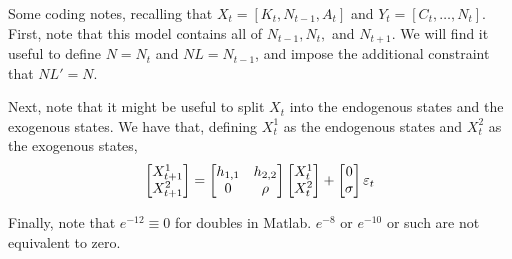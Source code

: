 \documentclass[10pt]{article}
\begin{document}
	\begin{remark}
		Some coding notes, recalling that $X_t = [K_t,N_{t-1},A_t]$ and $Y_t = [C_t,\dots,N_t]$. First, note that this model contains all of $N_{t-1},N_t,$ and $N_{t+1}$. We will find it useful to define $N = N_t$ and $NL = N_{t-1}$, and impose the additional constraint that $NL' = N$.
		
		Next, note that it might be useful to split $X_t$ into the endogenous states and the exogenous states. We have that, defining $X^1_t$ as the endogenous states and $X_t^2$ as the exogenous states,
		\[
		\begin{bmatrix}X_{t+1}^1 \\ X_{t+1}^2 \end{bmatrix} = \begin{bmatrix}h_{1,1} & h_{2,2} \\ 0 & \rho\end{bmatrix} \begin{bmatrix}X_t^1 \\ X_t^2\end{bmatrix} + \begin{bmatrix}0 \\ \sigma\end{bmatrix} \varepsilon_t
		\]
		
		Finally, note that $e^{-12} \equiv 0$ for doubles in Matlab. $e^{-8}$ or $e^{-10}$ or such are not equivalent to zero.
	\end{remark}
	
\end{document}
